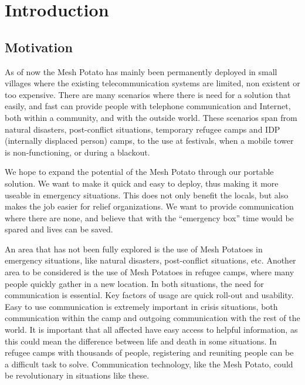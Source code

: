\chapter{Introduction}
\label{chp:introduction} 

\section{Motivation}
As of now the Mesh Potato has mainly been permanently deployed in small villages where the existing telecommunication systems are limited, non existent or too expensive. There are many scenarios where there is need for a solution that easily, and fast can provide people with telephone communication and Internet, both within a community, and with the outside world. These scenarios span from natural disasters, post-conflict situations, temporary refugee camps and IDP (internally displaced person) camps, to the use at festivals, when a mobile tower is non-functioning, or during a blackout. 

We hope to expand the potential of the Mesh Potato through our portable solution. We want to make it quick and easy to deploy, thus making it more useable in emergency situations. This does not only benefit the locals, but also makes the job easier for relief organizations. 
We want to provide communication where there are none,  and believe that with the “emergency box” time would be spared and lives can be saved.

An area that has not been fully explored is the use of Mesh Potatoes in emergency situations, like natural disasters, post-conflict situations, etc. Another area to be considered is the use of Mesh Potatoes in refugee camps, where many people quickly gather in a new location. In both situations, the need for communication is essential. Key factors of usage are quick roll-out and usability. Easy to use communication is extremely important in crisis situations, both communication within the camp and outgoing communication with the rest of the world. It is important that all affected have easy access to helpful information, as this could mean the difference between life and death in some situations. In refugee camps with thousands of people, registering and reuniting people can be a difficult task to solve. Communication technology, like the Mesh Potato, could be revolutionary in situations like these. 


